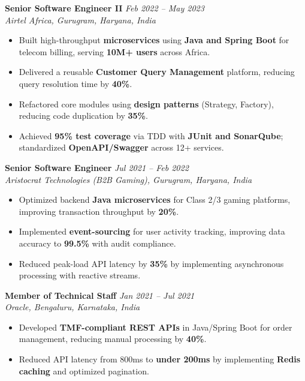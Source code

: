 \documentclass[10pt,a4paper]{article}
\begin{document}
\vspace{0.5pt}
\textbf{Senior Software Engineer II} \hfill \textit{Feb 2022 -- May 2023}\\[-1pt]
\textit{Airtel Africa, Gurugram, Haryana, India}
\begin{itemize}[label=\textbullet]
  \item Built high-throughput \textbf{microservices} using \textbf{Java and Spring Boot} for telecom billing, serving \textbf{10M+ users} across Africa.
  \item Delivered a reusable \textbf{Customer Query Management} platform, reducing query resolution time by \textbf{40\%}.
  \item Refactored core modules using \textbf{design patterns} (Strategy, Factory), reducing code duplication by \textbf{35\%}.
  \item Achieved \textbf{95\% test coverage} via TDD with \textbf{JUnit and SonarQube}; standardized \textbf{OpenAPI/Swagger} across 12+ services.
\end{itemize}

\vspace{0.5pt}
\textbf{Senior Software Engineer} \hfill \textit{Jul 2021 -- Feb 2022}\\[-1pt]
\textit{Aristocrat Technologies (B2B Gaming), Gurugram, Haryana, India}
\begin{itemize}[label=\textbullet]
  \item Optimized backend \textbf{Java microservices} for Class 2/3 gaming platforms, improving transaction throughput by \textbf{20\%}.
  \item Implemented \textbf{event-sourcing} for user activity tracking, improving data accuracy to \textbf{99.5\%} with audit compliance.
  \item Reduced peak-load API latency by \textbf{35\%} by implementing asynchronous processing with reactive streams.
\end{itemize}

\vspace{0.5pt}
\textbf{Member of Technical Staff} \hfill \textit{Jan 2021 -- Jul 2021}\\[-1pt]
\textit{Oracle, Bengaluru, Karnataka, India}
\begin{itemize}[label=\textbullet]
  \item Developed \textbf{TMF-compliant REST APIs} in Java/Spring Boot for order management, reducing manual processing by \textbf{40\%}.
  \item Reduced API latency from 800ms to \textbf{under 200ms} by implementing \textbf{Redis caching} and optimized pagination.
\end{itemize}
\end{document}
